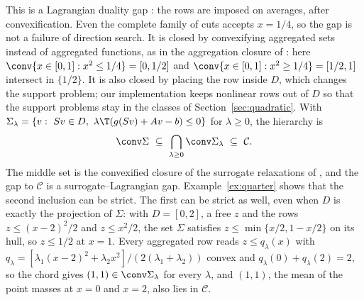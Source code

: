This is a Lagrangian duality gap \citep{Geoffrion1974,Nowak2005}: the rows are
imposed on averages, after convexification. Even the complete family of cuts
accepts $x=1/4$, so the gap is not a failure of direction search. It is
closed by convexifying aggregated sets instead of aggregated functions, as in
the aggregation closure of \citet{DeyMunozSerrano2022}: here
$\conv\{x\in[0,1]:x^2\le1/4\}=[0,1/2]$ and $\conv\{x\in[0,1]:x^2\ge1/4\}=[1/2,1]$
intersect in $\{1/2\}$. It is also closed by placing the row inside $D$, which
changes the support problem; our implementation keeps nonlinear rows out of
$D$ so that the support problems stay in the classes of
Section~\ref{sec:quadratic}. With
$\Sigma_\lambda=\{v:\ Sv\in D,\ \lambda\T(g(Sv)+Av-b)\le0\}$ for $\lambda\ge0$, the
hierarchy is
\[
\conv\Sigma\ \subseteq\ \bigcap_{\lambda\ge0}\conv\Sigma_\lambda\ \subseteq\ \mathcal C .
\]
The middle set is the convexified closure of the surrogate relaxations of
\citet{MullerEtAl2022}, and the gap to $\mathcal C$ is a surrogate--Lagrangian
gap. Example~\ref{ex:quarter} shows that the second inclusion can be strict.
The first can be strict as well, even when $D$ is exactly the projection of
$\Sigma$: with $D=[0,2]$, a free $z$ and the rows $z\le(x-2)^2/2$ and
$z\le x^2/2$, the set $\Sigma$ satisfies $z\le\min\{x/2,1-x/2\}$ on its hull,
so $z\le1/2$ at $x=1$. Every aggregated row reads $z\le q_\lambda(x)$ with
$q_\lambda=[\lambda_1(x-2)^2+\lambda_2x^2]/(2(\lambda_1+\lambda_2))$ convex and
$q_\lambda(0)+q_\lambda(2)=2$, so the chord gives $(1,1)\in\conv\Sigma_\lambda$ for
every $\lambda$, and $(1,1)$, the mean of the point masses at $x=0$ and $x=2$,
also lies in $\mathcal C$.
